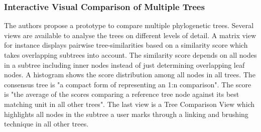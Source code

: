 \subsubsection{Interactive Visual Comparison of Multiple Trees\cite{bremm2011interactive}} The authors propose a prototype to compare multiple phylogenetic trees. Several views are available to analyse the trees on different levels of detail. A matrix view for instance displays pairwise tree-similarities based on a similarity score which takes overlapping subtrees into account. The similarity score depends on all nodes in a subtree including inner nodes instead of just determining overlapping leaf nodes. A histogram shows the score distribution among all nodes in all trees. The consensus tree is "a compact form of representing an 1:n comparison". The score is "the average of the scores comparing a reference tree node against its best matching unit in all other trees". The last view is a Tree Comparison View which highlights all nodes in the subtree a user marks through a linking and brushing technique in all other trees.


